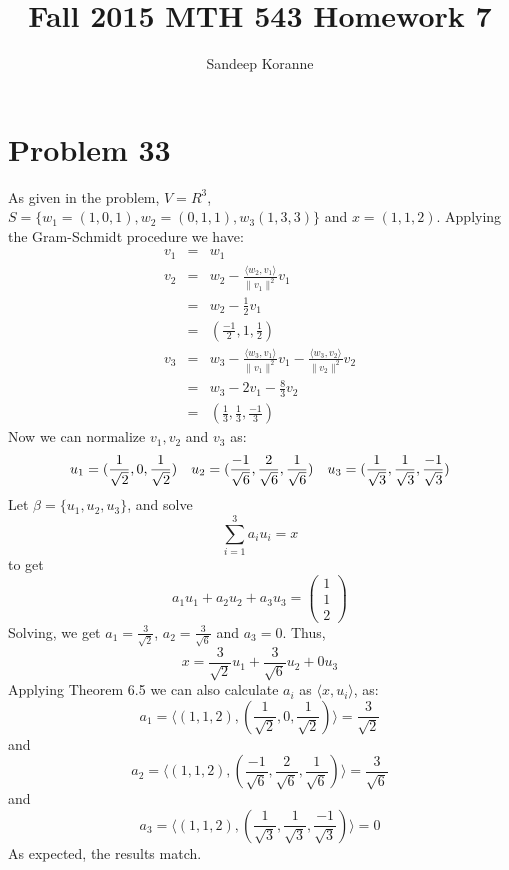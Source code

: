 \documentclass{article}[10pt]
\begin{document}
\title{Fall 2015 MTH 543 Homework 7}
\author{Sandeep Koranne}
\maketitle

\section{Problem 33}
As given in the problem, $V=R^3$, $S=\{w_1=(1,0,1),w_2=(0,1,1),w_3(1,3,3)\}$
and $x=(1,1,2)$. Applying the Gram-Schmidt procedure we have:
\begin{eqnarray}
v_1 & = & w_1 \nonumber \\ 
v_2 & = & w_2 - \frac{\langle w_2,v_1 \rangle}{\|v_1\|^2}v_1 \nonumber \\
    & = & w_2 -\frac{1}{2}v_1 \nonumber \\
    & = & (\frac{-1}{2},1,\frac{1}{2}) \nonumber \\
v_3 & = & w_3 - \frac{\langle w_3,v_1 \rangle}{\|v_1\|^2}v_1 - 
                \frac{\langle w_3,v_2 \rangle}{\|v_2\|^2}v_2 \nonumber \\
    & = & w_3 - 2v_1 - \frac{8}{3}v_2 \nonumber \\
    & = & (\frac{1}{3},\frac{1}{3},\frac{-1}{3}) \nonumber
\end{eqnarray}
Now we can normalize $v_1,v_2$ and $v_3$ as:
\begin{equation}
u_1 = (\frac{1}{\sqrt{2}},0,\frac{1}{\sqrt{2}}) \nonumber \quad
u_2 = (\frac{-1}{\sqrt{6}},\frac{2}{\sqrt{6}},\frac{1}{\sqrt{6}}) \quad
u_3 = (\frac{1}{\sqrt{3}},\frac{1}{\sqrt{3}},\frac{-1}{\sqrt{3}}) \nonumber \\
\end{equation}
Let $\beta=\{u_1,u_2,u_3\}$, and solve
\[
\sum_{i=1}^3 a_iu_i = x
\]
to get
\[
a_1u_1 + a_2u_2 + a_3u_3 = \begin{pmatrix} 1 \\ 1 \\ 2 \end{pmatrix}
\]
Solving, we get $a_1=\frac{3}{\sqrt{2}}$, $a_2=\frac{3}{\sqrt{6}}$
and $a_3=0$. Thus,
\[
x = \frac{3}{\sqrt{2}}u_1 + \frac{3}{\sqrt{6}}u_2 + 0u_3
\]
Applying Theorem 6.5 we can also calculate $a_i$ as $\langle x,u_i \rangle$, as:
\[
a_1 = \langle (1,1,2),(\frac{1}{\sqrt{2}},0,\frac{1}{\sqrt{2}}) \rangle = \frac{3}{\sqrt{2}}
\]
and
\[
a_2 = \langle (1,1,2),(\frac{-1}{\sqrt{6}},\frac{2}{\sqrt{6}},\frac{1}{\sqrt{6}}) \rangle = \frac{3}{\sqrt{6}}
\]
and
\[
a_3 = \langle (1,1,2),(\frac{1}{\sqrt{3}},\frac{1}{\sqrt{3}},\frac{-1}{\sqrt{3}}) \rangle =  0
\]
As expected, the results match.
\end{document}
